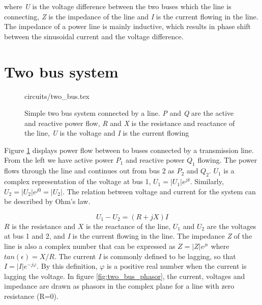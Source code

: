 \documentclass[class=book, crop=false]{standalone}
\begin{document}
where \textit{U} is the voltage difference between the two buses which the line is connecting, \textit{Z} is the impedance of the line and \textit{I} is the current flowing in the line. The impedance of a power line is mainly inductive, which results in phase shift between the sinusoidal  current and the voltage difference. 

\section{Two bus system}




\begin{figure}[ht!]
    \center
    {circuits/two_bus.tex}
    \caption[size = 9]
    {Simple two bus system connected by a line. \textit{P} and \textit{Q} are the active and reactive power flow, \textit{R} and \textit{X} is the resistance and reactance of the line, \textit{U} is the voltage and \textit{I} is the current flowing}    \label{fig:theory:two_bus}
\end{figure}

Figure \ref{fig:theory:two_bus} displays power flow between to buses connected by a transmission line. From the left we have active power $P_{1}$ and reactive power $Q_{1}$ flowing. The power flows through the line and continues out from bus 2 as $P_{2}$ and $Q_{2}$. $U_{1}$ is a complex representation of the voltage at bus 1, $U_{1} = |U_{1}|e^{j\delta}$. Similarly, $U_{2} = |U_{2}|e^{j0} = |U_{2}|$. The relation between voltage and current for the system can be described by Ohm's law.

\begin{equation}\label{eq:chap1_ohm}
    U_{1} - U_{2} = (R + jX)I
\end{equation}
$R$ is the resistance and $X$ is the reactance of the line, $U_{1}$ and $U_{2}$ are the voltages at bus 1 and 2, and \textit{I} is the current flowing in the line. The impedance \textit{Z} of the line is also a complex number that can be expressed as $Z = |Z|e^{j\epsilon}$ where $tan (\epsilon) = X/R$. The current \textit{I} is commonly defined to be lagging, so that $I = |I|e^{-j\varphi}$. By this definition, $\varphi$ is a positive real number when the current is lagging the voltage. In figure \ref{fig:two_bus_phasor}, the current, voltages and impedance are drawn as phasors in the complex plane for a line with zero resistance (R=0).
\end{document}
